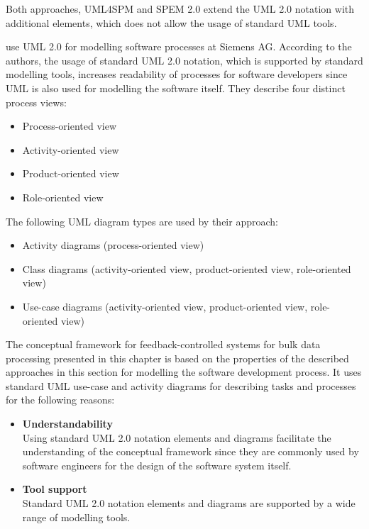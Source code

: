Both approaches, \ac{UML4SPM} and \ac{SPEM} 2.0 extend the \ac{UML} 2.0 notation with additional elements, which does not allow the usage of standard \ac{UML} tools.

\cite{Dietrich:2013aa} use \ac{UML} 2.0 for modelling software processes at Siemens AG. According to the authors, the usage of standard UML 2.0 notation, which is supported by standard modelling tools, increases readability of processes for software developers since UML is also used for modelling the software itself.
They describe four distinct process views: 
\begin{itemize}
	\item Process-oriented view
	\item Activity-oriented view
	\item Product-oriented view
	\item Role-oriented view
\end{itemize}

The following UML diagram types are used by their approach: 
\begin{itemize}
	\item Activity diagrams (process-oriented view)
	\item Class diagrams (activity-oriented view, product-oriented view, role-oriented view)
	\item Use-case diagrams (activity-oriented view, product-oriented view, role-oriented view)
\end{itemize} 

The conceptual framework for feedback-controlled systems for bulk data processing presented in this chapter is based on the properties of the described approaches in this section for modelling the software development process. It uses standard \ac{UML} use-case and activity diagrams for describing tasks and processes for the following reasons:
\begin{itemize}
	\item \textbf{Understandability}\\
	Using standard \ac{UML} 2.0 notation elements and diagrams facilitate the understanding of the conceptual framework since they are commonly used by software engineers for the design of the software system itself. 
	\item \textbf{Tool support}\\
	Standard \ac{UML} 2.0 notation elements and diagrams are supported by a wide range of modelling tools.
\end{itemize}

